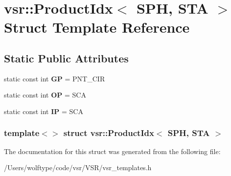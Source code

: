 \hypertarget{structvsr_1_1_product_idx_3_01_s_p_h_00_01_s_t_a_01_4}{\section{vsr\-:\-:Product\-Idx$<$ S\-P\-H, S\-T\-A $>$ Struct Template Reference}
\label{structvsr_1_1_product_idx_3_01_s_p_h_00_01_s_t_a_01_4}
}
\subsection*{Static Public Attributes}
\begin{DoxyCompactItemize}
\item 
\hypertarget{structvsr_1_1_product_idx_3_01_s_p_h_00_01_s_t_a_01_4_ab31b9141d5215df3849853a03e49d585}{static const int {\bfseries G\-P} = P\-N\-T\-\_\-\-C\-I\-R}\label{structvsr_1_1_product_idx_3_01_s_p_h_00_01_s_t_a_01_4_ab31b9141d5215df3849853a03e49d585}

\item 
\hypertarget{structvsr_1_1_product_idx_3_01_s_p_h_00_01_s_t_a_01_4_aec0bb5b053b030bcaadeef9340e8b654}{static const int {\bfseries O\-P} = S\-C\-A}\label{structvsr_1_1_product_idx_3_01_s_p_h_00_01_s_t_a_01_4_aec0bb5b053b030bcaadeef9340e8b654}

\item 
\hypertarget{structvsr_1_1_product_idx_3_01_s_p_h_00_01_s_t_a_01_4_a43b6b423237e6d5e2152e27136ed83ff}{static const int {\bfseries I\-P} = S\-C\-A}\label{structvsr_1_1_product_idx_3_01_s_p_h_00_01_s_t_a_01_4_a43b6b423237e6d5e2152e27136ed83ff}

\end{DoxyCompactItemize}
\subsubsection*{template$<$$>$ struct vsr\-::\-Product\-Idx$<$ S\-P\-H, S\-T\-A $>$}



The documentation for this struct was generated from the following file\-:\begin{DoxyCompactItemize}
\item 
/\-Users/wolftype/code/vsr/\-V\-S\-R/vsr\-\_\-templates.\-h\end{DoxyCompactItemize}
